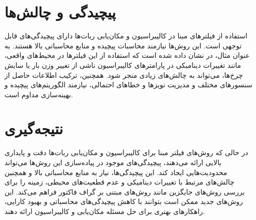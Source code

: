 \section{پیچیدگی و چالش‌ها}
استفاده از فیلترهای مبنا در کالیبراسیون و مکان‌یابی ربات‌ها دارای پیچیدگی‌های قابل توجهی است. این روش‌ها نیازمند محاسبات پیچیده و منابع محاسباتی بالا هستند. به عنوان مثال، در \cite{SLAK4} نشان داده شده است که استفاده از این فیلترها در محیط‌های واقعی، مانند تغییرات دینامیکی در پارامترهای کالیبراسیون ناشی از تغییر وزن بار یا سایش چرخ‌ها، می‌تواند به چالش‌های زیادی منجر شود. همچنین، ترکیب اطلاعات حاصل از سنسورهای مختلف و مدیریت نویزها و خطاهای احتمالی، نیازمند الگوریتم‌های پیچیده و بهینه‌سازی مداوم است.

\section{نتیجه‌گیری}
در حالی که روش‌های فیلتر مبنا برای کالیبراسیون و مکان‌یابی ربات‌ها دقت و پایداری بالایی ارائه می‌دهند، پیچیدگی‌های موجود در پیاده‌سازی این روش‌ها می‌تواند محدودیت‌هایی ایجاد کند. این پیچیدگی‌ها، نیاز به منابع محاسباتی بالا و همچنین چالش‌های مرتبط با تغییرات دینامیکی و عدم قطعیت‌های محیطی، زمینه را برای بررسی روش‌های جایگزین مانند روش‌های مبتنی بر گراف فاکتور فراهم می‌کند. این روش‌های جدید ممکن است بتوانند با کاهش پیچیدگی‌های محاسباتی و بهبود کارایی، راهکارهای بهتری برای حل مسئله مکان‌یابی و کالیبراسیون ارائه دهند.
